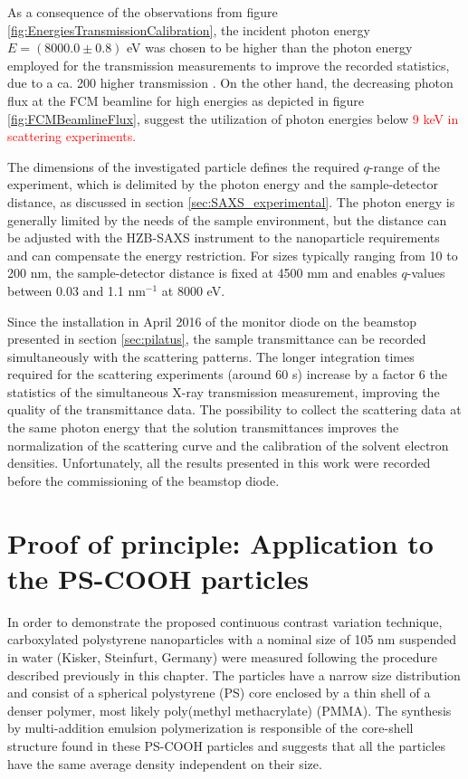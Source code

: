 As a consequence of the observations from figure \ref{fig:EnergiesTransmissionCalibration}, the incident photon energy \(E = \left(8000.0  \pm 0.8\right)\) eV was chosen to be higher than the photon energy employed for the transmission measurements to improve the recorded statistics, due to a ca. 200 higher transmission \citep{henke_x-ray_1993}. On the other hand, the decreasing photon flux at the FCM beamline for high energies as depicted in figure \ref{fig:FCMBeamlineFlux}, suggest the utilization of photon energies below \textcolor{red}{9 keV in scattering experiments.}

The dimensions of the investigated particle defines the required $q$-range of the experiment, which is delimited by the photon energy and the sample-detector distance, as discussed in section \ref{sec:SAXS_experimental}. The photon energy is generally limited by the needs of the sample environment, but the distance can be adjusted with the HZB-SAXS instrument to the nanoparticle requirements and can compensate the energy restriction. For sizes typically ranging from 10 to 200 nm, the sample-detector distance is fixed at 4500 mm and enables $q$-values between 0.03 and 1.1 nm$^{-1}$ at 8000 eV.

Since the installation in April 2016 of the monitor diode on the beamstop presented in section \ref{sec:pilatus}, the sample transmittance can be recorded simultaneously with the scattering patterns. The longer integration times required for the scattering experiments (around 60 s) increase by a factor 6 the statistics of the simultaneous X-ray transmission measurement, improving the quality of the transmittance data. The possibility to collect the scattering data at the same photon energy that the solution transmittances improves the normalization of the scattering curve and the calibration of the solvent electron densities. Unfortunately, all the results presented in this work were recorded before the commissioning of the beamstop diode.

\section{Proof of principle: Application to the PS-COOH particles}
\label{sec:KiskerResults}

In order to demonstrate the proposed continuous contrast variation technique, carboxylated polystyrene nanoparticles with a nominal size of 105 nm suspended in water (Kisker, Steinfurt, Germany) were measured following the procedure described previously in this chapter. The particles have a narrow size distribution and consist of a spherical polystyrene (PS) core enclosed by a thin shell of a denser polymer, most likely poly(methyl methacrylate) (PMMA). The synthesis by multi-addition emulsion polymerization is responsible of the core-shell structure found in these PS-COOH particles and suggests that all the particles have the same average density independent on their size.

